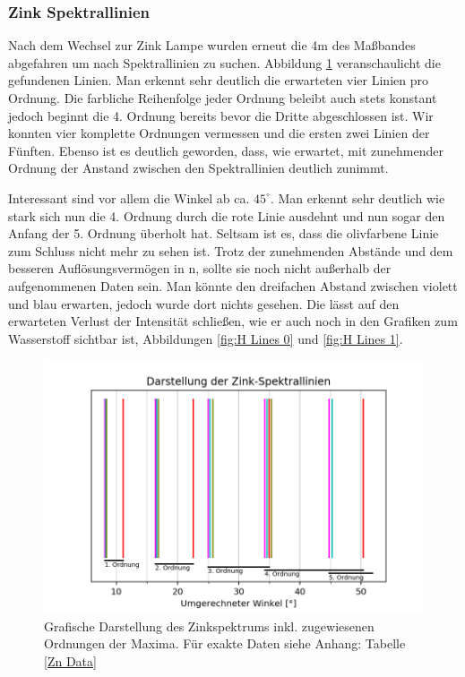 \documentclass[]{article}
\begin{document}
\subsubsection{Zink Spektrallinien}
Nach dem Wechsel zur Zink Lampe wurden erneut die 4m des Maßbandes abgefahren um nach Spektrallinien zu suchen. Abbildung \ref{fig:Zink} veranschaulicht die gefundenen Linien. Man erkennt sehr deutlich die erwarteten vier Linien pro Ordnung. Die farbliche Reihenfolge jeder Ordnung beleibt auch stets konstant jedoch beginnt die 4. Ordnung bereits bevor die Dritte abgeschlossen ist. Wir konnten vier komplette Ordnungen vermessen und die ersten zwei Linien der Fünften. Ebenso ist es deutlich geworden, dass, wie erwartet, mit zunehmender Ordnung der Anstand zwischen den Spektrallinien deutlich zunimmt. 

Interessant sind vor allem die Winkel ab ca. $45^\circ$. Man erkennt sehr deutlich wie stark sich nun die 4. Ordnung durch die rote Linie ausdehnt und nun sogar den Anfang der 5. Ordnung überholt hat. Seltsam ist es, dass die olivfarbene Linie zum Schluss nicht mehr zu sehen ist. Trotz der zunehmenden Abstände und dem besseren Auflösungsvermögen in n, sollte sie noch nicht außerhalb der aufgenommenen Daten sein. Man könnte den dreifachen Abstand zwischen violett und blau erwarten, jedoch wurde dort nichts gesehen. Die lässt auf den erwarteten Verlust der Intensität schließen, wie er auch noch in den Grafiken zum Wasserstoff sichtbar ist, Abbildungen \ref{fig:H Lines 0} und \ref{fig:H Lines 1}.

\begin{figure}[H]
\centering
\includegraphics[width=.9\linewidth]{Plots/Zink_Linien.png}
\caption{ Grafische Darstellung des Zinkspektrums inkl. zugewiesenen Ordnungen der Maxima. Für exakte Daten siehe Anhang: Tabelle \ref{Zn Data} }
\label{fig:Zink}
\end{figure}
\end{document}
